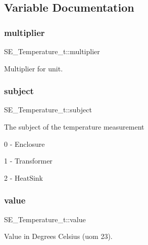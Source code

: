 \subsection{Variable Documentation}
\mbox{\label{group__Temperature_ga0e1fe0344bacec2b9b548fe575158e69}} 
\subsubsection{\texorpdfstring{multiplier}{multiplier}}
{\footnotesize\ttfamily S\+E\+\_\+\+Temperature\+\_\+t\+::multiplier}

Multiplier for \textquotesingle{}unit\textquotesingle{}. \mbox{\label{group__Temperature_ga59d44f7aa6422a7f439a3637c1adcf3a}} 
\subsubsection{\texorpdfstring{subject}{subject}}
{\footnotesize\ttfamily S\+E\+\_\+\+Temperature\+\_\+t\+::subject}

The subject of the temperature measurement

0 -\/ Enclosure

1 -\/ Transformer

2 -\/ Heat\+Sink \mbox{\label{group__Temperature_ga466376bcb700edec44b9601bd2441605}} 
\subsubsection{\texorpdfstring{value}{value}}
{\footnotesize\ttfamily S\+E\+\_\+\+Temperature\+\_\+t\+::value}

Value in Degrees Celsius (uom 23). 